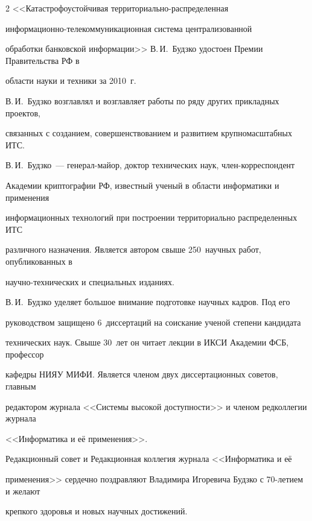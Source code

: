\begin{multicols}{2}
<<Катастрофоустойчивая тер\-ри\-то\-ри\-аль\-но-рас\-пре\-де\-лен\-ная

      ин\-фор\-ма\-ци\-он\-но-те\-ле\-ком\-му\-ни\-ка\-ци\-он\-ная сис\-те\-ма централизованной

обработки банковской информации>> В.\,И.~Будзко удостоен Премии Правительства РФ в

области науки и техники за 2010~г.



      В.\,И.~Будзко возглавлял и возглавляет работы по ряду других прикладных проектов,

связанных с созданием, совершенствованием и развитием крупномасштабных ИТС.



      В.\,И.~Будзко~--- генерал-майор, доктор технических наук, член-кор\-рес\-пон\-дент

Академии криптографии РФ, известный ученый в области информатики и применения

информационных технологий при построении территориально распределенных ИТС

различного назначения. Является автором свыше 250~научных работ, опубликованных в

на\-уч\-но-тех\-ни\-че\-ских и специальных изданиях.



    \thispagestyle{empty}



      В.\,И.~Будзко уделяет большое внимание подготовке научных кадров. Под его

руководством защищено 6~диссертаций на соискание ученой степени кандидата

технических наук. Свыше 30~лет он читает лекции в ИКСИ Академии ФСБ, профессор

кафедры НИЯУ МИФИ. Является членом двух диссертационных советов, главным

редактором журнала <<Системы высокой доступности>> и членом редколлегии журнала

<<Информатика и её применения>>.



      \bigskip



      Редакционный совет и Редакционная коллегия журнала <<Информатика и её

применения>> сердечно поздравляют Владимира Игоревича Будзко с 70-ле\-ти\-ем и желают

крепкого здоровья и новых научных достижений.



\end{multicols}

